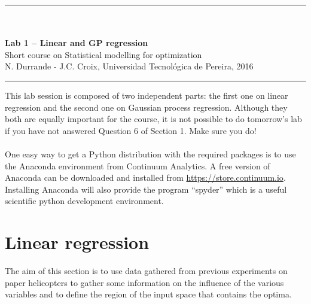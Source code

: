\documentclass[12pt]{scrartcl}
\begin{document}
\begin{center}
	\rule{\textwidth}{1pt}
	\\ \ \\
	{\LARGE \textbf{Lab 1 -- Linear and GP regression}}\\ 
	\vspace{3mm}
	{\large Short course on Statistical modelling for optimization\\ \vspace{3mm}}
	{\normalsize N. Durrande - J.C. Croix, Universidad Tecnol\'ogica de Pereira, 2016}\\ 
	\vspace{3mm}
	\rule{\textwidth}{1pt}
	\vspace{5mm}
\end{center}
This lab session is composed of two independent parts: the first one on linear regression and the second one on Gaussian process regression. Although they both are equally important for the course, it is not possible to do tomorrow's lab if you have not answered Question 6 of Section 1. Make sure you do!

\paragraph{}
\noindent One easy way to get a Python distribution with the required packages is to use the Anaconda environment from Continuum Analytics.
A free version of Anaconda can be downloaded and installed from  \url{https://store.continuum.io}. Installing Anaconda will also provide the program ``spyder'' which is a useful scientific python development environment.

\section{Linear regression}
The aim of this section is to use data gathered from previous experiments on paper helicopters to gather some information on the influence of the various variables and to define the region of the input space that contains the optima.

\end{document}

